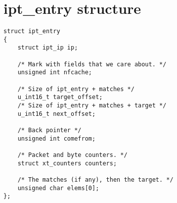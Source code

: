 \chapter{ipt_entry structure}
\label{appendix:ipt-entry}
\lstset{language=C,caption=,label=test-bridge-config}
\begin{lstlisting}
struct ipt_entry
{
	struct ipt_ip ip;

	/* Mark with fields that we care about. */
	unsigned int nfcache;

	/* Size of ipt_entry + matches */
	u_int16_t target_offset;
	/* Size of ipt_entry + matches + target */
	u_int16_t next_offset;

	/* Back pointer */
	unsigned int comefrom;

	/* Packet and byte counters. */
	struct xt_counters counters;

	/* The matches (if any), then the target. */
	unsigned char elems[0];
};
\end{lstlisting}
